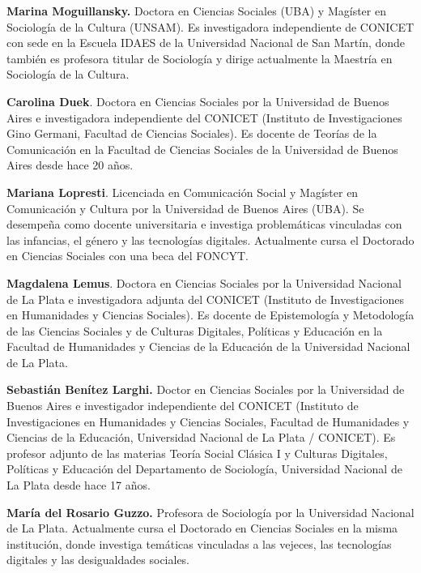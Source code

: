 
\label{cap-23}

\textbf{Marina Moguillansky.} Doctora en Ciencias Sociales (UBA) y Magíster en Sociología de la Cultura (UNSAM). Es investigadora independiente de CONICET con sede en la Escuela IDAES de la Universidad Nacional de San Martín, donde también es profesora titular de Sociología y dirige actualmente la Maestría en Sociología de la Cultura.

\textbf{Carolina Duek}. Doctora en Ciencias Sociales por la Universidad de Buenos Aires e investigadora independiente del CONICET (Instituto de Investigaciones Gino Germani, Facultad de Ciencias Sociales). Es docente de Teorías de la Comunicación en la Facultad de Ciencias Sociales de la Universidad de Buenos Aires desde hace 20 años.

\textbf{Mariana Lopresti}. Licenciada en Comunicación Social y Magíster en Comunicación y Cultura por la Universidad de Buenos Aires (UBA). Se desempeña como docente universitaria e investiga problemáticas vinculadas con las infancias, el género y las tecnologías digitales. Actualmente cursa el Doctorado en Ciencias Sociales con una beca del FONCYT.

\textbf{Magdalena Lemus}. Doctora en Ciencias Sociales por la Universidad Nacional de La Plata e investigadora adjunta del CONICET (Instituto de Investigaciones en Humanidades y Ciencias Sociales). Es docente de Epistemología y Metodología de las Ciencias Sociales y de Culturas Digitales, Políticas y Educación en la Facultad de Humanidades y Ciencias de la Educación de la Universidad Nacional de La Plata.

\textbf{Sebastián Benítez Larghi.} Doctor en Ciencias Sociales por la Universidad de Buenos Aires e investigador independiente del CONICET (Instituto de Investigaciones en Humanidades y Ciencias Sociales, Facultad de Humanidades y Ciencias de la Educación, Universidad Nacional de La Plata / CONICET). Es profesor adjunto de las materias Teoría Social Clásica I y Culturas Digitales, Políticas y Educación del Departamento de Sociología, Universidad Nacional de La Plata desde hace 17 años.

\textbf{María del Rosario Guzzo.} Profesora de Sociología por la Universidad Nacional de La Plata. Actualmente cursa el Doctorado en Ciencias Sociales en la misma institución, donde investiga temáticas vinculadas a las vejeces, las tecnologías digitales y las desigualdades sociales.

